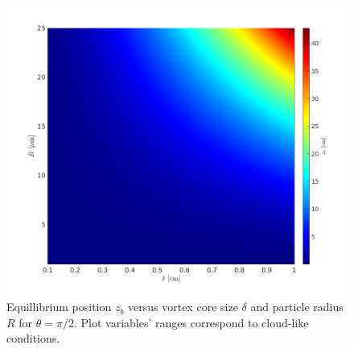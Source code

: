 \documentclass[../main.tex]{subfiles}
\begin{document}
\begin{figure}
\centering
\noindent \includegraphics[width=30pc]{gfx/z_b_vs_delta_R.png}
\caption{Equillibrium position $z_b$ versus vortex core size $\delta$ and particle radius $R$ for $\theta=\pi/2$. Plot variables' ranges correspond to cloud-like conditions.}
\label{fig:ch3_0}
\end{figure}
\end{document}
